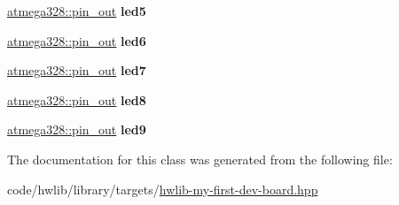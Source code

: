 \begin{DoxyCompactItemize}
\hyperlink{classatmega328_1_1pin__out}{atmega328\+::pin\+\_\+out} {\bfseries led5}
\item 
\mbox{\label{classmy__first__dev__board_1_1board_a4355cda996b35bfe78ce7cf2d6656fac}} 
\hyperlink{classatmega328_1_1pin__out}{atmega328\+::pin\+\_\+out} {\bfseries led6}
\item 
\mbox{\label{classmy__first__dev__board_1_1board_a4929d4bfd53eae45a483dbcd3c1ab0ce}} 
\hyperlink{classatmega328_1_1pin__out}{atmega328\+::pin\+\_\+out} {\bfseries led7}
\item 
\mbox{\label{classmy__first__dev__board_1_1board_a8e4e943267fe1ba6fcc9a1d3d1954b3a}} 
\hyperlink{classatmega328_1_1pin__out}{atmega328\+::pin\+\_\+out} {\bfseries led8}
\item 
\mbox{\label{classmy__first__dev__board_1_1board_a2d40d507c45b16b0ccd90a34ea59f4d2}} 
\hyperlink{classatmega328_1_1pin__out}{atmega328\+::pin\+\_\+out} {\bfseries led9}
\end{DoxyCompactItemize}


The documentation for this class was generated from the following file\+:\begin{DoxyCompactItemize}
\item 
code/hwlib/library/targets/\hyperlink{hwlib-my-first-dev-board_8hpp}{hwlib-\/my-\/first-\/dev-\/board.\+hpp}\end{DoxyCompactItemize}
